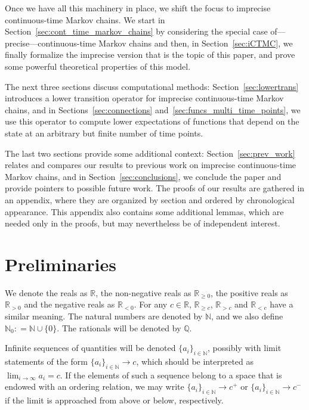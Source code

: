 \documentclass[10pt,a4paper]{paper}
\theoremstyle{definition}
\newcommand{\nats}{\mathbb{N}}
\newcommand{\reals}{\mathbb{R}}
\newcommand{\realspos}{\reals_{>0}}
\newcommand{\realsnonneg}{\reals_{\geq 0}}
\newcommand{\coloneqq}{:\!=}
\begin{document}
Once we have all this machinery in place, we shift the focus to imprecise continuous-time Markov chains. We start in Section~\ref{sec:cont_time_markov_chains} by considering the special case of---precise---continuous-time Markov chains and then, in Section~\ref{sec:iCTMC}, we finally formalize the imprecise version that is the topic of this paper, and prove some powerful theoretical properties of this model.


The next three sections discuss computational methods: Section~\ref{sec:lowertrans} introduces a lower transition operator for imprecise continuous-time Markov chains, and in Sections~\ref{sec:connections} and~\ref{sec:funcs_multi_time_points}, we use this operator to compute lower expectations of functions that depend on the state at an arbitrary but finite number of time points. 

The last two sections provide some additional context: Section~\ref{sec:prev_work} relates and compares our results to previous work on imprecise continuous-time Markov chains, and in
Section~\ref{sec:conclusions}, we conclude the paper and provide pointers to possible future work. The proofs of our results are gathered in an appendix, where they are organized by section and ordered by chronological appearance. This appendix also contains some additional lemmas, which are needed only in the proofs, but may nevertheless be of independent interest.

\section{Preliminaries}\label{sec:prelim}

We denote the reals as $\reals$, the non-negative reals as $\realsnonneg$, the positive reals as $\realspos$ and the negative reals as $\reals_{<0}$. For any $c\in\reals$, $\reals_{\geq c}$, $\reals_{>c}$ and $\reals_{<c}$ have a similar meaning. The natural numbers are denoted by $\nats$, and we also define $\nats_0\coloneqq\nats\cup\{0\}$. The rationals will be denoted by $\mathbb{Q}$.

Infinite sequences of quantities will be denoted $\{a_i\}_{i\in\nats}$, possibly with limit statements of the form $\{a_i\}_{i\in\nats}\to c$, which should be interpreted as $\lim_{i\to\infty}a_i=c$. If the elements of such a sequence belong to a space that is endowed with an ordering relation, we may write $\{a_i\}_{i\in\nats}\to c^+$ or $\{a_i\}_{i\in\nats}\to c^-$ if the limit is approached from above or below, respectively.
\end{document}
